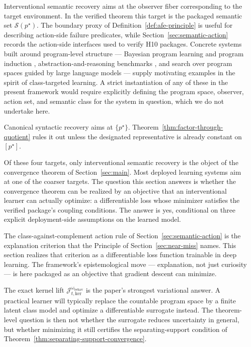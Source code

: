 \documentclass[11pt]{article}
\theoremstyle{definition}
\theoremstyle{remark}
\theoremstyle{plain}
\theoremstyle{definition}
\newcommand{\Scal}{\mathcal{S}}
\begin{document}
Interventional semantic recovery aims at the observer fiber corresponding to the target environment. In the verified theorem this target is the packaged semantic set $\Scal(p^\star)$. The boundary proxy of Definition~\ref{def:afe-principle} is useful for describing action-side failure predicates, while Section~\ref{sec:semantic-action} records the action-side interfaces used to verify H10 packages. Concrete systems built around program-level structure --- Bayesian program learning and program induction \citep{LakeEtAl2015,EllisEtAl2021DreamCoder}, abstraction-and-reasoning benchmarks \citep{CholletARC2019}, and search over program spaces guided by large language models \citep{RomeraParedesEtAl2024FunSearch} --- supply motivating examples in the spirit of class-targeted learning. A strict instantiation of any of these in the present framework would require explicitly defining the program space, observer, action set, and semantic class for the system in question, which we do not undertake here.

Canonical syntactic recovery aims at $\{p^\star\}$. Theorem~\ref{thm:factor-through-quotient} rules it out unless the designated representative is already constant on $[p^\star]$.

Of these four targets, only interventional semantic recovery is the object of the convergence theorem of Section~\ref{sec:main}. Most deployed learning systems aim at one of the coarser targets. The question this section answers is whether the convergence theorem can be realized by an objective that an interventional learner can actually optimize: a differentiable loss whose minimizer satisfies the verified package's coupling conditions. The answer is yes, conditional on three explicit deployment-side assumptions on the learned model.

The class-against-complement action rule of Section~\ref{sec:semantic-action} is the explanation criterion that the Principle of Section~\ref{sec:near-miss} names. This section realizes that criterion as a differentiable loss function trainable in deep learning. The framework's epistemological move --- explanation, not just curiosity --- is here packaged as an objective that gradient descent can minimize.

The exact kernel lift $\mathcal J_{t,\mathrm{ker}}^{\omega_{\mathrm{behav}}}$ is the paper's strongest variational answer. A practical learner will typically replace the countable program space by a finite latent class model and optimize a differentiable surrogate instead. The theorem-level question is then not whether the surrogate reduces uncertainty in general, but whether minimizing it still certifies the separating-support condition of Theorem~\ref{thm:separating-support-convergence}.
\end{document}
